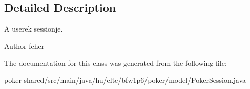 \subsection{Detailed Description}
A userek sessionje. \begin{DoxyAuthor}{Author}
feher 
\end{DoxyAuthor}


The documentation for this class was generated from the following file\+:\begin{DoxyCompactItemize}
\item 
poker-\/shared/src/main/java/hu/elte/bfw1p6/poker/model/Poker\+Session.\+java\end{DoxyCompactItemize}
